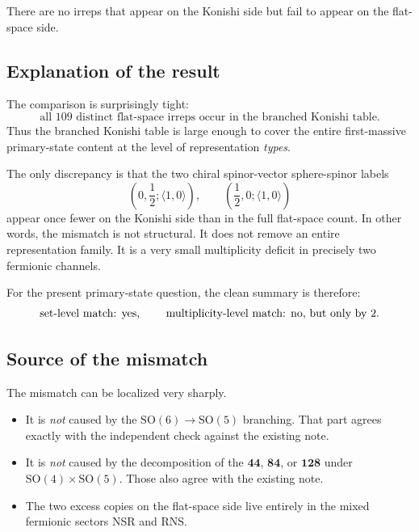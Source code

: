 \documentclass[12pt]{article}
\newcommand{\SO}{\mathrm{SO}}
\newcommand{\la}{\langle}
\newcommand{\ra}{\rangle}
\newcommand{\bb}{\mathbf}
\newcommand{\half}{\frac{1}{2}}
\begin{document}
There are no irreps that appear on the Konishi side but fail to appear on the flat-space side.

\subsection{Explanation of the result}

The comparison is surprisingly tight:
\begin{equation}
\text{all 109 distinct flat-space irreps occur in the branched Konishi table.}
\end{equation}
Thus the branched Konishi table is large enough to cover the entire first-massive primary-state
content at the level of representation \emph{types}.

The only discrepancy is that the two chiral spinor-vector sphere-spinor labels
\begin{equation}
(0,\half;\la 1,0\ra),\qquad (\half,0;\la 1,0\ra)
\end{equation}
appear once fewer on the Konishi side than in the full flat-space count. In other words,
the mismatch is not structural. It does not remove an entire representation family.
It is a very small multiplicity deficit in precisely two fermionic channels.

For the present primary-state question, the clean summary is therefore:
\begin{equation}
\text{set-level match: yes, \qquad multiplicity-level match: no, but only by }2.
\end{equation}

\subsection{Source of the mismatch}

The mismatch can be localized very sharply.
\begin{itemize}
\item It is \emph{not} caused by the $\SO(6)\to \SO(5)$ branching. That part agrees exactly with the
independent check against the existing note.
\item It is \emph{not} caused by the decomposition of the $\bb{44}$, $\bb{84}$, or $\bb{128}$ under
$\SO(4)\times \SO(5)$. Those also agree with the existing note.
\item The two excess copies on the flat-space side live entirely in the mixed fermionic sectors NSR and RNS.
\end{itemize}
\end{document}
